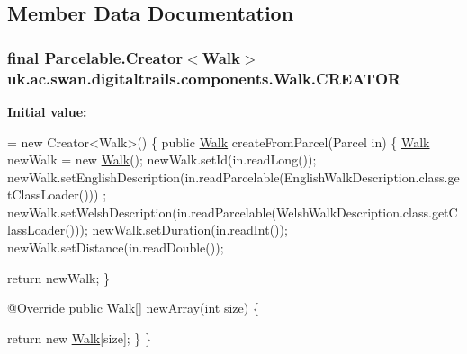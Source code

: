 \subsection{Member Data Documentation}
\hypertarget{classuk_1_1ac_1_1swan_1_1digitaltrails_1_1components_1_1_walk_ab469affd3e3855b4319e907c95387385}{
\subsubsection[{C\+R\+E\+A\+T\+O\+R}]{\setlength{\rightskip}{0pt plus 5cm}final Parcelable.\+Creator$<${\bf Walk}$>$ uk.\+ac.\+swan.\+digitaltrails.\+components.\+Walk.\+C\+R\+E\+A\+T\+O\+R\hspace{0.3cm}{\ttfamily [static]}}}\label{classuk_1_1ac_1_1swan_1_1digitaltrails_1_1components_1_1_walk_ab469affd3e3855b4319e907c95387385}
{\bfseries Initial value\+:}
\begin{DoxyCode}
= \textcolor{keyword}{new} Creator<Walk>() \{
        \textcolor{keyword}{public} \hyperlink{classuk_1_1ac_1_1swan_1_1digitaltrails_1_1components_1_1_walk_ae7daf6a8692296bf65be0a3eb065a4c9}{Walk} createFromParcel(Parcel in) \{
            \hyperlink{classuk_1_1ac_1_1swan_1_1digitaltrails_1_1components_1_1_walk_ae7daf6a8692296bf65be0a3eb065a4c9}{Walk} newWalk = \textcolor{keyword}{new} \hyperlink{classuk_1_1ac_1_1swan_1_1digitaltrails_1_1components_1_1_walk_ae7daf6a8692296bf65be0a3eb065a4c9}{Walk}();
            newWalk.setId(in.readLong());
            newWalk.setEnglishDescription(in.readParcelable(EnglishWalkDescription.class.getClassLoader()))
      ;
            newWalk.setWelshDescription(in.readParcelable(WelshWalkDescription.class.getClassLoader()));
            newWalk.setDuration(in.readInt());
            newWalk.setDistance(in.readDouble());
            
            \textcolor{keywordflow}{return} newWalk;
        \}

        @Override
        \textcolor{keyword}{public} \hyperlink{classuk_1_1ac_1_1swan_1_1digitaltrails_1_1components_1_1_walk_ae7daf6a8692296bf65be0a3eb065a4c9}{Walk}[] newArray(\textcolor{keywordtype}{int} size) \{
            
            \textcolor{keywordflow}{return} \textcolor{keyword}{new} \hyperlink{classuk_1_1ac_1_1swan_1_1digitaltrails_1_1components_1_1_walk_ae7daf6a8692296bf65be0a3eb065a4c9}{Walk}[size];
        \}
    \}
\end{DoxyCode}



